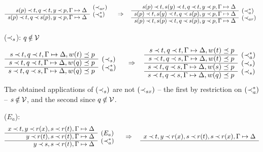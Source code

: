 \begin{PROOF}
\begin{LS}
\[\begin{array}{rl}
 s(p) \Incl t, q\Incl t, y\Incl p, \GSD & \rabove{(\Incl_{ar})} \\
 \cline{1-1}
 s(p) \Incl t, q\Incl s(p), y\Incl p, \GSD & \rabove{(\Incl_a^*)}
 \end{array} \conv
 \begin{array}{rl}
s(p)\Incl t, s(y)\Incl t, q\Incl t, y\Incl p, \GSD \\ \cline{1-1}
s(p)\Incl t, s(y)\Incl t, q\Incl s(p), y\Incl p, \GSD &
\rabove{(\Incl_a^*)} \\ \cline{1-1}
s(p)\Incl t, s(p)\Incl t, q\Incl s(p), y\Incl p, \GSD &
\rabove{(\Incl_{ar})} \end{array} \]
%
\item ($\mathbin{\prec}_s$): $q\not\in\Vars$
\[ \begin{array}{rl}
s\Incl t, q\Incl t, \GSD, w(t)\preceq p \\ \cline{1-1}
s\Incl t, q\Incl t, \GSD, w(q)\preceq p & \rabove{(\Incl_s)} \\
\cline{1-1}
s\Incl t, q\Incl s, \GSD, w(q)\preceq p & \rabove{(\Incl_a^*)} \end{array} \conv
 \begin{array}{rl}
s\Incl t, q\Incl t, \GSD, w(t)\preceq p \\ \cline{1-1}
s\Incl t, q\Incl s, \GSD, w(t)\preceq p & \rabove{(\Incl_a^*)} \\
\cline{1-1}
s\Incl t, q\Incl s, \GSD, w(s)\preceq p & \rabove{(\Incl_s)} \\
\cline{1-1} 
s\Incl t, q\Incl s, \GSD, w(q)\preceq p & \rabove{(\Incl_s)} 
\end{array} \]
The obtained applications of $(\mathbin{\prec}_s)$ are not $(\mathbin{\prec}_{sx})$ -- the first
by restriction on $(\mathbin{\prec}_a^*)$ -- $s\not\in\Vars$, and the second since $q\not\in\Vars$.
\item ($E_a$):
\[ \begin{array}{rl}
x\Incl t, y\Incl r(x), s\Incl r(t), \GSD \\ \cline{1-1}
          y\Incl r(t), s\Incl r(t), \GSD  & \rabove{(E_a)} \\ \cline{1-1}
          y\Incl s, s\Incl r(t), \GSD  & \rabove{(\Incl_a^*)} \end{array}
  \conv
 \begin{array}{rl}
x\Incl t, y\Incl r(x), s\Incl r(t), s\Incl r(x),\GSD \\ \cline{1-1}

\end{array}\]
\end{LS}
\end{PROOF}
